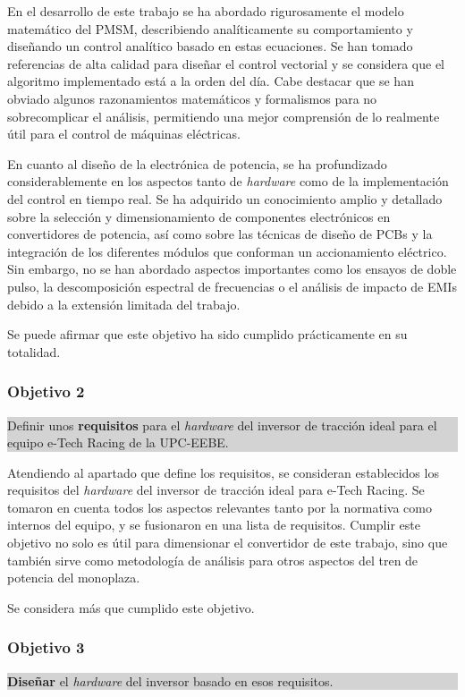 En el desarrollo de este trabajo se ha abordado rigurosamente el modelo matemático del PMSM, describiendo analíticamente su comportamiento y diseñando un control analítico basado en estas ecuaciones. Se han tomado referencias de alta calidad para diseñar el control vectorial y se considera que el algoritmo implementado está a la orden del día. Cabe destacar que se han obviado algunos razonamientos matemáticos y formalismos para no sobrecomplicar el análisis, permitiendo una mejor comprensión de lo realmente útil para el control de máquinas eléctricas.

En cuanto al diseño de la electrónica de potencia, se ha profundizado considerablemente en los aspectos tanto de \textit{hardware} como de la implementación del control en tiempo real. Se ha adquirido un conocimiento amplio y detallado sobre la selección y dimensionamiento de componentes electrónicos en convertidores de potencia, así como sobre las técnicas de diseño de PCBs y la integración de los diferentes módulos que conforman un accionamiento eléctrico. Sin embargo, no se han abordado aspectos importantes como los ensayos de doble pulso, la descomposición espectral de frecuencias o el análisis de impacto de EMIs debido a la extensión limitada del trabajo.

Se puede afirmar que este objetivo ha sido cumplido prácticamente en su totalidad.

\subsubsection*{Objetivo 2}
\colorbox{lightgray}{%
	\parbox{\dimexpr\linewidth-2\fboxsep-2\fboxrule}{%
		Definir unos \textbf{requisitos} para el \textit{hardware} del inversor de tracción ideal para el equipo e-Tech Racing de la UPC-EEBE.%
	}%
}

Atendiendo al apartado que define los requisitos, se consideran establecidos los requisitos del \textit{hardware} del inversor de tracción ideal para e-Tech Racing. Se tomaron en cuenta todos los aspectos relevantes tanto por la normativa como internos del equipo, y se fusionaron en una lista de requisitos. Cumplir este objetivo no solo es útil para dimensionar el convertidor de este trabajo, sino que también sirve como metodología de análisis para otros aspectos del tren de potencia del monoplaza. 

Se considera más que cumplido este objetivo.

\subsubsection*{Objetivo 3}
\colorbox{lightgray}{%
	\parbox{\dimexpr\linewidth-2\fboxsep-2\fboxrule}{%
		\textbf{Diseñar} el \textit{hardware} del inversor basado en esos requisitos.%
	}%
}

